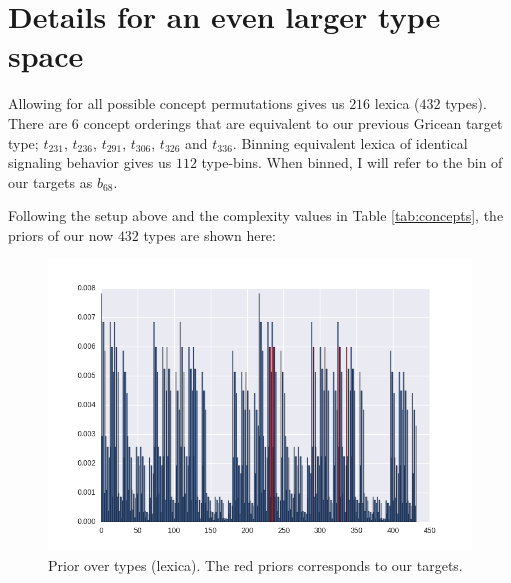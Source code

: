 \documentclass[a4paper]{article}
\begin{document}
\newpage

\section*{Details for an even larger type space}

Allowing for all possible concept permutations gives us $216$ lexica ($432$ types). There are $6$ concept orderings that are equivalent to our previous Gricean target type; $t_{231}$, $t_{236}$, $t_{291}$, $t_{306}$, $t_{326}$ and $t_{336}$. Binning equivalent lexica of identical signaling behavior gives us $112$ type-bins. When binned, I will refer to the bin of our targets as $b_{68}$.

Following the setup above and the complexity values in Table \ref{tab:concepts}, the priors of our now $432$ types are shown here:

\begin{figure}[h!]
  \centering
  \includegraphics[scale=.45]{../code-LOT-extension/plots/priors-meFalse432.png} %
  \caption{Prior over types (lexica). The red priors corresponds to our targets.}
\end{figure}
\end{document}
